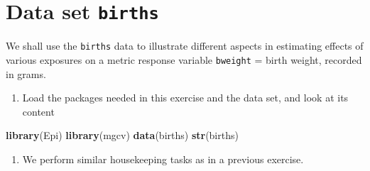 \documentclass[
]{book}
\newenvironment{Shaded}{\begin{snugshade}}{\end{snugshade}}
\newcommand{\AttributeTok}[1]{\textcolor[rgb]{0.13,0.29,0.53}{#1}}
\newcommand{\ConstantTok}[1]{\textcolor[rgb]{0.56,0.35,0.01}{#1}}
\newcommand{\DecValTok}[1]{\textcolor[rgb]{0.00,0.00,0.81}{#1}}
\newcommand{\FunctionTok}[1]{\textcolor[rgb]{0.13,0.29,0.53}{\textbf{#1}}}
\newcommand{\NormalTok}[1]{#1}
\newcommand{\OtherTok}[1]{\textcolor[rgb]{0.56,0.35,0.01}{#1}}
\newcommand{\SpecialCharTok}[1]{\textcolor[rgb]{0.81,0.36,0.00}{\textbf{#1}}}
\newcommand{\StringTok}[1]{\textcolor[rgb]{0.31,0.60,0.02}{#1}}
\providecommand{\tightlist}{%
  \setlength{\itemsep}{0pt}\setlength{\parskip}{0pt}}
\begin{document}
\section{\texorpdfstring{Data set \texttt{births}}{Data set births}}\label{data-set-births}

We shall use the \texttt{births} data to illustrate
different aspects in estimating effects of various exposures on a metric response variable
\texttt{bweight} = birth weight, recorded in grams.

\begin{enumerate}
\def\labelenumi{\arabic{enumi}.}
\tightlist
\item
  Load the packages needed in this exercise and the data set, and look at its content
\end{enumerate}

\begin{Shaded}
\begin{Highlighting}[]
\FunctionTok{library}\NormalTok{(Epi)}
\FunctionTok{library}\NormalTok{(mgcv)}
\FunctionTok{data}\NormalTok{(births)}
\FunctionTok{str}\NormalTok{(births)}
\end{Highlighting}
\end{Shaded}

\begin{enumerate}
\def\labelenumi{\arabic{enumi}.}
\setcounter{enumi}{1}
\tightlist
\item
  We perform similar housekeeping tasks as in a previous exercise.
\end{enumerate}

\begin{Shaded}
\end{Shaded}
\end{document}
